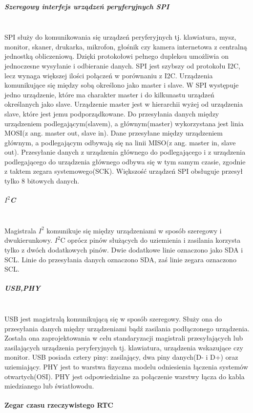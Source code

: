 \documentclass[12p]{article}
\begin{document}
\subparagraph{Szeregowy interfejs urządzeń peryferyjnych SPI} \mbox{} \\

SPI służy do komunikowania się urządzeń peryferyjnych tj. klawiatura, mysz, monitor, skaner, drukarka, mikrofon, głośnik czy kamera internetowa z centralną jednostką obliczeniową. Dzięki protokołowi pełnego dupleksu umożliwia on jednoczesne wysyłanie i odbieranie danych. SPI jest szybszy od protokołu I2C, lecz wynaga większej ilości połączeń w porównaniu z I2C. Urządzenia komunikujące się między sobą określono jako master i slave. W SPI występuje jedno urządzenie, które ma charakter master i do kilkunastu urządzeń określanych jako slave. Urządzenie master jest w hierarchii wyżej od urządzenia slave, które jest jemu podporządkowane. Do przesyłania danych między urządzeniem  podlegającym(slavem), a głównym(master) wykorzystana jest linia MOSI(z ang. master out, slave in). Dane przesyłane między urządzeniem głównym, a podlegającym odbywają się na linii MISO(z ang. master in, slave out). Przesyłanie danych z urządzenia głównego do podlegającego i z urządzenia podlegającego do urządzenia głównego odbywa się w tym samym czasie, zgodnie z taktem zegara systemowego(SCK). Większość urządzeń SPI obsługuje przesył tylko 8 bitowych danych.

\subparagraph{$I^{2}$C} \mbox{} \\

Magistrala $I^{2}$ komunikuje się między urządzeniami w sposób szeregowy i dwukierunkowy. $I^{2}$C oprócz pinów służących do uziemienia i zasilania korzysta tylko z dwóch dodatkowych pinów. Dwie dodatkowe linie oznaczono jako SDA i SCL. Linie do przesyłania danych oznaczono SDA, zaś linie zegara oznaczono SCL.

\subparagraph{USB,PHY} \mbox{} \\

USB jest magistralą komunikującą się w sposób szeregowy. Służy ona do przesyłania danych między urządzeniami bądź zasilania podłączonego urządzenia. Została ona zaprojektowania w celu standaryzacji magistrali przesyłających lub zasilających urządzenia peryferyjnych tj. klawiatura, urządzenia wskazujące czy monitor. USB posiada cztery piny: zasilający, dwa piny danych(D- i D+) oraz uziemiający. PHY jest to warstwa fizyczna modelu odniesienia łączenia systemów otwartych(OSI). PHY jest odpowiedzialne za połączenie warstwy łącza do kabla miedzianego lub światłowodu.


\paragraph{Zegar czasu rzeczywistego RTC} \mbox{} \\
\end{document}

